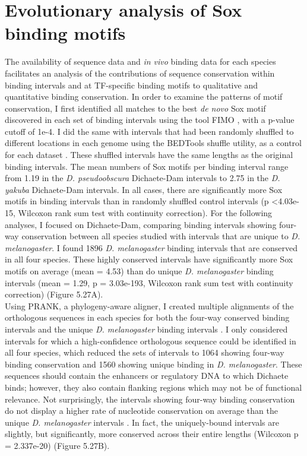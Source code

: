 \section{Evolutionary analysis of Sox binding motifs}
The availability of sequence data and \emph{in vivo} binding data for each species facilitates an analysis of the contributions of sequence conservation within binding intervals and at TF-specific binding motifs to qualitative and quantitative binding conservation. In order to examine the patterns of motif conservation, I first identified all matches to the best \emph{de novo} Sox motif discovered in each set of binding intervals using the tool FIMO \citep{grant_fimo:_2011}, with a p-value cutoff of 1e-4. I did the same with intervals that had been randomly shuffled to different locations in each genome using the BEDTools shuffle utility, as a control for each dataset \citep{quinlan_bedtools:_2010}. These shuffled intervals have the same lengths as the original binding intervals. The mean numbers of Sox motifs per binding interval range from 1.19 in the \emph{D. pseudoobscura} Dichaete-Dam intervals to 2.75 in the \emph{D. yakuba} Dichaete-Dam intervals. In all cases, there are significantly more Sox motifs in binding intervals than in randomly shuffled control intervals (p \textless 4.03e-15, Wilcoxon rank sum test with continuity correction). For the following analyses, I focused on Dichaete-Dam, comparing binding intervals showing four-way conservation between all species studied with intervals that are unique to \emph{D. melanogaster}. I found 1896 \emph{D. melanogaster} binding intervals that are conserved in all four species. These highly conserved intervals have significantly more Sox motifs on average (mean = 4.53) than do unique \emph{D. melanogaster} binding intervals (mean = 1.29, p = 3.03e-193, Wilcoxon rank sum test with continuity correction) (Figure 5.27A).\\

Using PRANK, a phylogeny-aware aligner, I created multiple alignments of the orthologous sequences in each species for both the four-way conserved binding intervals and the unique \emph{D. melanogaster} binding intervals \citep{loytynoja_algorithm_2005,loytynoja_phylogeny-aware_2008}. I only considered intervals for which a high-confidence orthologous sequence could be identified in all four species, which reduced the sets of intervals to 1064 showing four-way binding conservation and 1560 showing unique binding in \emph{D. melanogaster}. These sequences should contain the enhancers or regulatory DNA to which Dichaete binds; however, they also contain flanking regions which may not be of functional relevance. Not surprisingly, the intervals showing four-way binding conservation do not display a higher rate of nucleotide conservation on average than the unique \emph{D. melanogaster} intervals \citep{he_high_2011}. In fact, the uniquely-bound intervals are slightly, but significantly, more conserved across their entire lengths (Wilcoxon p = 2.337e-20) (Figure 5.27B).\\

